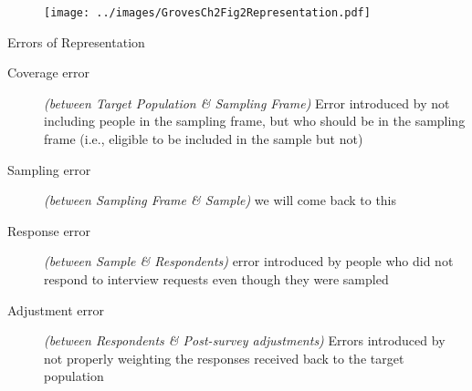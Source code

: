 \documentclass[]{beamer}
\begin{document}
\begin{frame}
\begin{figure}[h!]
\begin{center}
\texttt{[image: ../images/GrovesCh2Fig2Representation.pdf]}
\end{center}
\end{figure}
\end{frame}

\begin{frame}{Errors of Representation}
\begin{description}
\item[Coverage error] \textit{(between Target Population \& Sampling Frame)} Error introduced by not including people in the sampling frame, but who should be in the sampling frame (i.e., eligible to be included in the sample but not)
\item[Sampling error] \textit{(between Sampling Frame \& Sample)} we will come back to this
\item[Response error] \textit{(between Sample \& Respondents)} error introduced by people who did not respond to interview requests even though they were sampled
\item[Adjustment error] \textit{(between Respondents \& Post-survey adjustments)} Errors introduced by not properly weighting the responses received back to the target population
\end{description}
\end{frame}
\end{document}
